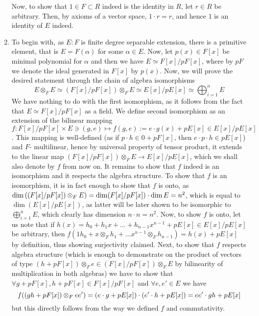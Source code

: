 \documentclass[8pt,fleqn]{article} %
\begin{document}
\begin{enumerate}[label=\bfseries Problem \arabic*.]
		Now, to show that $1\in F\subset R$ indeed is the identity in $R$, let $r\in R$ be arbitrary. Then, by axioms of
		a vector space, $1\cdot r=r$, and hence $1$ is an identity of $E$ indeed.
	\item To begin with, as $E:F$ is finite degree separable extension, there is a primitive element, that is $E=F(\alpha)$
		for some $\alpha\in E$. Now, let $p(x)\in F[x]$ be minimal polynomial for $\alpha$ and then we have $E\simeq F[x]
		/pF[x]$, where by $pF$ we denote the ideal generated in $F[x]$ by $p(x)$. Now, we will prove the desired
		statement through the chain of algebra isomorphisms
		\[E\otimes_F E\simeq (F[x]/pF[x])\otimes_F E\simeq E[x]/pE[x]\simeq \bigoplus_{i=1}^n E\]
		We have nothing to do with the first isomorphism, as it follows from the fact that $E\simeq F[x]/pF[x]$ as a field. 
		We define second isomorphism as an extension of the bilinear mapping $f:F[x]/pF[x]\times E\ni(g,e)\mapsto f(g,e):=e\cdot g(x)+
		pE[x]\in E[x]/pE[x]$. This mapping is well-defined (as if $p\cdot h\in 0+pF[x]$, then $e\cdot p\cdot h\in pE[x]$) and $F$-
		multilinear,
		hence by universal property of tensor product, it extends to the linear map $(F[x]/pF[x])\otimes_F E\to E[x]/pE[x]$, which we
		shall also denote by $f$ from now on.
		It remains to show that $f$ indeed is an isomorphism and it respects the algebra structure. To show that
		$f$ is an isomorphism, it is in fact enough to show that $f$ is onto, as $\dim\left((F[x]/pF[x])\otimes_F E\right)=\dim(F[x]/pF[x])\cdot
		\dim E=n^2$, which is equal to $\dim(E[x]/pE[x])$, as latter will be later shown to be isomorphic to $\bigoplus_{i=1}^n E$,
		which clearly has dimension $n\cdot n=n^2$. Now, to show $f$ is onto, let us note that if $h(x)=h_0+h_1x+\hdots+h_{n-1}x^{n-1}+pE[x]
		\in E[x]/pE[x]$ be arbitrary, then $f(1h_0 +x\otimes_F h_1+\hdots x^{n-1}\otimes_F h_{n-1})=h(x)+pE[x]$ by definition, thus
		showing surjectivity claimed. Next, to show that $f$ respects algebra structure (which is enough to demonstrate on the product
		of vectors of type $(h+pF[x]
		)\otimes_F e\in(F[x]/pF[x])\otimes_F E$ by bilinearity of multiplication in both algebras) we have to show
		that $\forall g+pF[x],h+pF[x]\in F[x]/pF[x]$ and $\forall e,e'\in E$ we have
		\[f((gh+pF[x])\otimes_F ee')=\left(e\cdot g+pE[x]\right)\cdot\left(e'\cdot h+pE[x]\right)=ee'\cdot gh+pE[x]\]
		but this directly follows from the way we defined $f$ and commutativity.


\end{enumerate}
\end{document}
